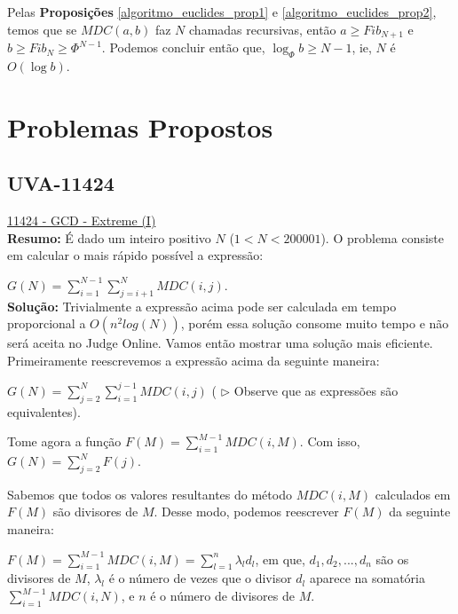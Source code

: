 Pelas \textbf{Proposições} \autoref{algoritmo_euclides_prop1} e \autoref{algoritmo_euclides_prop2}, temos que se $MDC(a,b)$ faz $N$
chamadas recursivas, então $a \geq Fib_{N+1}$ e $b \geq Fib_N \geq \Phi^{N-1}$. 
Podemos concluir então que, $\log_\Phi b \geq N-1$, ie, $N$ é $O(\log b)$. 




\section{Problemas Propostos}


\subsection{UVA-11424}
\href{https://uva.onlinejudge.org/index.php?option=onlinejudge&page=show_problem&problem=2419}{11424 - GCD - Extreme (I)} \\

\textbf{Resumo:}
É dado um inteiro positivo $N$ ($1 < N < 200001$). O problema consiste em calcular o mais rápido possível a expressão:

$G(N) = \sum_{i=1}^{N-1}\sum_{j=i+1}^{N}MDC(i,j)$.
\\

\textbf{Solução:}
Trivialmente a expressão acima pode ser calculada em tempo proporcional a $O(n^2log(N))$, porém essa solução consome muito tempo e não será aceita no Judge Online. Vamos então mostrar uma solução mais eficiente.
\\

Primeiramente reescrevemos a expressão acima da seguinte maneira:

$G(N) = \sum_{j=2}^N\sum_{i=1}^{j-1}MDC(i,j)$ ( $\rhd$ Observe que as expressões são equivalentes).

Tome agora a função $F(M) = \sum_{i=1}^{M-1}MDC(i, M)$. Com isso, $G(N) = \sum_{j=2}^NF(j)$.

Sabemos que todos os valores resultantes do método $MDC(i,M)$ calculados em $F(M)$ são divisores de $M$. Desse modo, podemos reescrever $F(M)$ da seguinte maneira:

$F(M) = \sum_{i=1}^{M-1}MDC(i, M) = \sum_{l=1}^{n}\lambda_l d_l$, em que, $d_1, d_2,..., d_n$ são os divisores de $M$, $\lambda_l$ é o número de vezes que o divisor $d_l$ aparece na somatória $\sum_{i=1}^{M-1}MDC(i,N)$, e $n$ é o número de divisores de $M$.
\\

